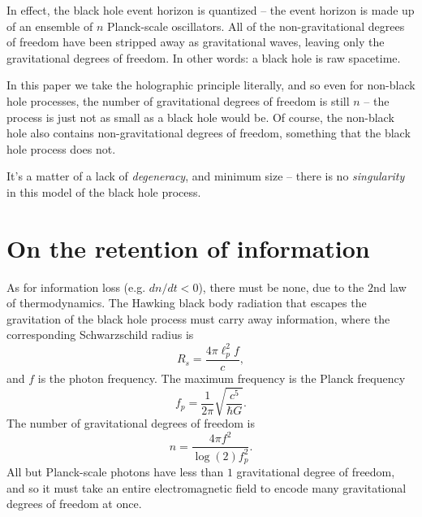 \documentclass[12pt]{article}
\begin{document}
In effect, the black hole event horizon is quantized -- the event horizon is made up of an ensemble of $n$ Planck-scale oscillators.
All of the non-gravitational degrees of freedom have been stripped away as gravitational waves, leaving only the gravitational degrees of freedom.
In other words: a black hole is raw spacetime.

In this paper we take the holographic principle literally, and so even for non-black hole processes, the number of gravitational degrees of freedom is still $n$ -- the process is just not as small as a black hole would be.
Of course, the non-black hole also contains non-gravitational degrees of freedom, something that the black hole process does not.

It's a matter of a lack of {\textit{degeneracy}}, and minimum size -- there is no {\textit{singularity}} in this model of the black hole process.







\section{On the retention of information}

As for information loss (e.g. $dn / dt < 0$), there must be none, due to the $2$nd law of thermodynamics.
The Hawking black body radiation that escapes the gravitation of the black hole process must carry away information, where the corresponding Schwarzschild radius is
\begin{equation}
R_s = \frac{4 \pi \ell_p^2 f}{c},
\end{equation}
and $f$ is the photon frequency.
The maximum frequency is the Planck frequency
\begin{equation}
f_p = \frac{1}{2 \pi} \sqrt{\frac{c^5}{\hbar G}}.
\end{equation}
The number of gravitational degrees of freedom is
\begin{equation}
n = \frac{4 \pi f^2}{\log(2) f_p^2}.%
\end{equation}
All but Planck-scale photons have less than $1$ gravitational degree of freedom, and so it must take an entire electromagnetic field to encode many gravitational degrees of freedom at once.

\end{document}

